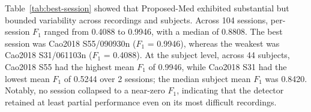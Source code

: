Table~\ref{tab:best-session} showed that Proposed-Med exhibited substantial but bounded variability across recordings and subjects. Across 104 sessions, per-session $F_1$ ranged from 0.4088 to 0.9946, with a median of 0.8808. The best session was Cao2018 S55/090930n ($F_1$ = 0.9946), whereas the weakest was Cao2018 S31/061103n ($F_1$ = 0.4088). At the subject level, across 44 subjects, Cao2018 S55 had the highest mean $F_1$ of 0.9946, while Cao2018 S31 had the lowest mean $F_1$ of 0.5244 over 2 sessions; the median subject mean $F_1$ was 0.8420. Notably, no session collapsed to a near-zero $F_1$, indicating that the detector retained at least partial performance even on its most difficult recordings.
